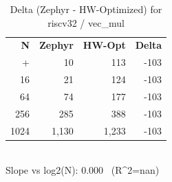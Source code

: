\begin{table}[tb]
    \centering
    \caption{Delta (Zephyr - HW-Optimized) for riscv32 / vec_mul}
    \label{tab:delta_riscv32_vec_mul}
    \scriptsize
    \begin{tabular}{r r r r}
        \hline
        \textbf{N} & \textbf{Zephyr} & \textbf{HW-Opt} & \textbf{Delta} \\\n+        \hline
        4 & 10 & 113 & -103\\
        16 & 21 & 124 & -103\\
        64 & 74 & 177 & -103\\
        256 & 285 & 388 & -103\\
        1024 & 1,130 & 1,233 & -103\\
        \hline
    \end{tabular}
    \vspace{2mm}\\\n    Slope vs log2(N): 0.000 \ (R^2=nan)\n\end{table}
